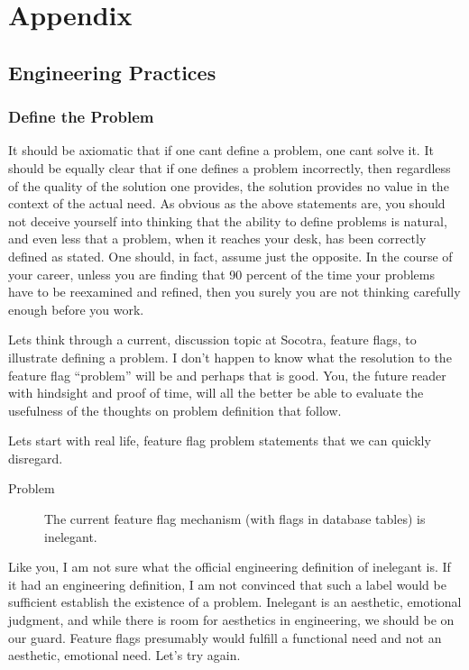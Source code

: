 
\appendix
{}
\chapter{Appendix}
\label{introA} %

\section{Engineering Practices}
\label{sec:A1}

\subsection{Define the Problem}
\label{sec:A2}
It should be axiomatic that if one cant define a problem, one cant solve it. It should be equally clear that if one defines a
problem incorrectly, then regardless of the quality of the solution one provides, the solution provides no value in the context of
the actual need.
As obvious as the above statements are, you should not deceive yourself into thinking that the ability to define
problems is natural, and even less that a problem, when it reaches your desk, has been correctly defined as stated. One should, in fact,
assume just the opposite.
In the course of your career, unless you are finding that 90 percent of the time your problems have to be reexamined and refined,
then you surely you are not thinking carefully enough before you work.

Lets think through a current, discussion topic at Socotra, feature flags, to illustrate defining a problem. I don't happen to know what the
resolution to the feature flag ``problem'' will be and perhaps that is good. You, the future reader with hindsight and proof of time, will
all the better be able to evaluate the usefulness of the thoughts on problem definition that follow.

Lets start with real life, feature flag problem statements that we can quickly disregard.
\begin{description}
\item[Problem] The current feature flag
mechanism (with flags in database tables) is inelegant.
\end{description}
Like you, I am not sure what the official engineering definition of inelegant
is. If it had an engineering definition, I am not convinced that such a label would be sufficient establish the existence of a
problem. Inelegant is an aesthetic, emotional judgment, and while there is room for aesthetics in engineering, we should be on our
guard. Feature flags presumably would fulfill a functional need and not an aesthetic, emotional need. Let's try again.

